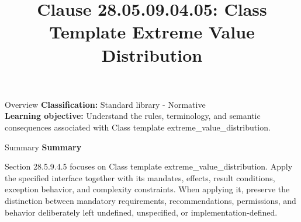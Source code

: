 \documentclass[10pt,letterpaper]{article}
\title{Clause 28.05.09.04.05: Class Template Extreme Value Distribution}
\author{}
\date{}
\begin{document}
\maketitle
\begin{CornellOverviewBox}{Overview}
\textbf{Classification:} Standard library - Normative\\[2pt]
\textbf{Learning objective:} Understand the rules, terminology, and semantic consequences associated with Class template extreme\_value\_distribution.
\end{CornellOverviewBox}\begin{CornellSummaryBox}{Summary}
{\sffamily\bfseries\color{Accent} Summary}\par\vspace{3pt}Section 28.5.9.4.5 focuses on Class template extreme\_value\_distribution. Apply the specified interface together with its mandates, effects, result conditions, exception behavior, and complexity constraints. When applying it, preserve the distinction between mandatory requirements, recommendations, permissions, and behavior deliberately left undefined, unspecified, or implementation-defined.
\end{CornellSummaryBox}
\end{document}
